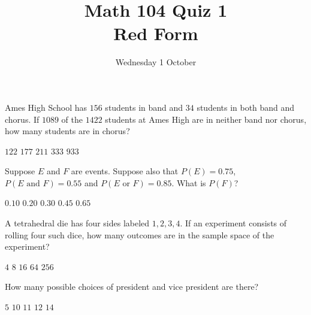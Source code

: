 \documentclass[answers,12pt]{exam}
\title{Math 104 Quiz 1\\Red Form}
\date{Wednesday 1 October}
\begin{document}
\maketitle
\begin{center}
\end{center}

\begin{questions}
\question Ames High School has
$156$ students in band and $34$
students in both band and chorus.
If $1089$ of the $1422$ students at Ames High
are in neither band nor chorus, how many students
are in chorus?\\
\begin{oneparchoices}
\choice $122$ %
\choice $177$ %
\correctchoice $211$
\choice $333$ %
\choice $933$ %
\end{oneparchoices}

\question Suppose $E$ and $F$ are events.
Suppose also that $P\left(E\right)=0.75$,
$P\left(\text{$E$ and $F$}\right)=0.55$
and $P\left(\text{$E$ or $F$}\right)=0.85$. What
is $P\left(F\right)$?\\
\begin{oneparchoices}
\choice $0.10$ %
\choice $0.20$ %
\choice $0.30$ %
\choice $0.45$ %
\correctchoice $0.65$
\end{oneparchoices}

\question A tetrahedral die has four sides labeled $1,2,3,4$.
If an experiment consists of rolling four such dice, how
many outcomes are in the sample space of the experiment?\\
\begin{oneparchoices}
\choice $4$ %
\choice $8$
\choice $16$ %
\choice $64$ %
\correctchoice $256$
\end{oneparchoices}


\question\label{FirstPresident}
How many possible choices of president and vice president are there?\\
\begin{oneparchoices}
\choice $5$ %
\correctchoice $10$
\choice $11$ %
\choice $12$ %
\choice $14$ %
\end{oneparchoices}


\end{questions}
\end{document}

